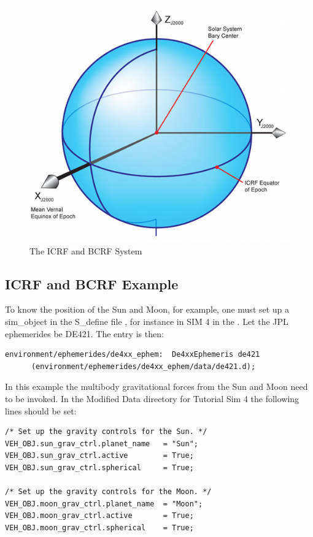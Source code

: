 \newpage
\begin{figure}[!ht]
\centering
\includegraphics [width=7in]{figs/fig1.png}
\caption{The ICRF and BCRF System}
\label{fig:1}
\end{figure}

\subsection{ICRF and BCRF Example}
To know the position of the Sun and Moon, for example, one must set up a sim\_object in the S\_define file , for instance in SIM 4 in the \hyperTutorial. Let the JPL ephemerides be DE421. The entry is then:
\begin{verbatim}
environment/ephemerides/de4xx_ephem:  De4xxEphemeris de421
      (environment/ephemerides/de4xx_ephem/data/de421.d);
\end{verbatim}
In this example the multibody gravitational forces from the Sun and Moon need to be invoked. In the Modified Data directory for Tutorial Sim 4 the following lines should be set:

\begin{verbatim}
/* Set up the gravity controls for the Sun. */
VEH_OBJ.sun_grav_ctrl.planet_name   = "Sun";
VEH_OBJ.sun_grav_ctrl.active        = True;
VEH_OBJ.sun_grav_ctrl.spherical     = True;

/* Set up the gravity controls for the Moon. */
VEH_OBJ.moon_grav_ctrl.planet_name  = "Moon";
VEH_OBJ.moon_grav_ctrl.active       = True;
VEH_OBJ.moon_grav_ctrl.spherical    = True;
\end{verbatim}


